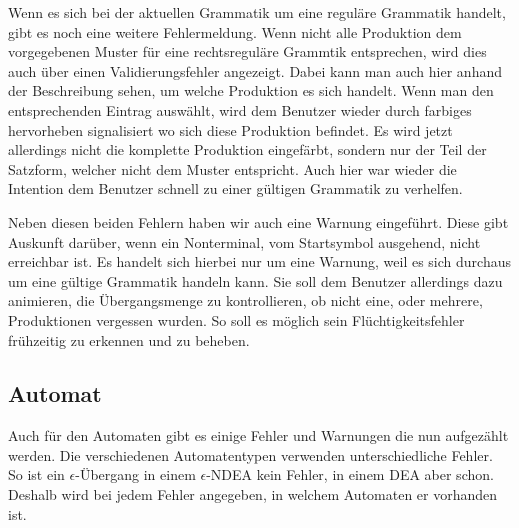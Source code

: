 Wenn es sich bei der aktuellen Grammatik um eine reguläre Grammatik handelt,
gibt es noch eine weitere Fehlermeldung. Wenn nicht alle Produktion dem
vorgegebenen Muster für eine rechtsreguläre Grammtik entsprechen, wird dies auch
über einen Validierungsfehler angezeigt. Dabei kann man auch hier anhand der
Beschreibung sehen, um welche Produktion es sich handelt. Wenn man den
entsprechenden Eintrag auswählt, wird dem Benutzer wieder durch farbiges
hervorheben signalisiert wo sich diese Produktion befindet. Es wird jetzt
allerdings nicht die komplette Produktion eingefärbt, sondern nur der Teil der
Satzform, welcher nicht dem Muster entspricht. Auch hier war wieder die
Intention dem Benutzer schnell zu einer gültigen Grammatik zu
verhelfen.\vspace{10pt}

Neben diesen beiden Fehlern haben wir auch eine Warnung eingeführt. Diese gibt
Auskunft darüber, wenn ein Nonterminal, vom Startsymbol ausgehend, nicht
erreichbar ist. Es handelt sich hierbei nur um eine Warnung, weil es sich
durchaus um eine gültige Grammatik handeln kann. Sie soll dem Benutzer allerdings
dazu animieren, die Übergangsmenge zu kontrollieren, ob nicht eine, oder mehrere,
Produktionen vergessen wurden. So soll es möglich sein Flüchtig\-keits\-fehler
frühzeitig zu erkennen und zu beheben.

\subsection{Automat}

Auch für den Automaten gibt es einige Fehler und Warnungen die nun aufgezählt
werden. Die verschiedenen Automatentypen verwenden unterschiedliche Fehler. So
ist ein $\epsilon$-Übergang in einem $\epsilon$-NDEA kein Fehler, in einem DEA
aber schon. Deshalb wird bei jedem Fehler angegeben, in welchem Automaten er
vorhanden ist.\vspace{10pt}

